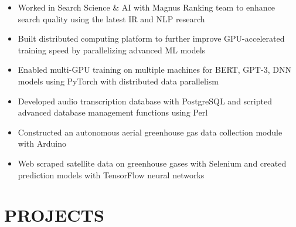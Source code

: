 \documentclass[11pt,letterpaper]{article}
\begin{document}
  \begin{itemize}
    \item{Worked in Search Science \& AI with Magnus Ranking team to enhance search quality using the latest IR and NLP research}
    \item{Built distributed computing platform to further improve GPU-accelerated training speed by parallelizing advanced ML models}
    \item{Enabled multi-GPU training on multiple machines for BERT, GPT-3, DNN models using PyTorch with distributed data parallelism}
  \end{itemize}

  {\fontsize{12}{12}}

  \begin{itemize}
    \item{Developed audio transcription database with PostgreSQL and scripted advanced database management functions using Perl}
  \end{itemize}

  {\fontsize{12}{12}}

  \begin{itemize}
    \item{Constructed an autonomous aerial greenhouse gas data collection module with Arduino}

    \item{Web scraped satellite data on greenhouse gases with Selenium and created prediction models with TensorFlow neural networks}
  \end{itemize}

  \smallskip


  \section*{PROJECTS}

  \ifguardian
    {\fontsize{12}{12}}
\end{document}
